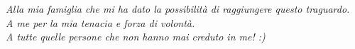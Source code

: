 \null{}
\begin{flushright}
	\textit{Alla mia famiglia che mi ha dato la possibilità di raggiungere questo traguardo.} \\
	\textit{A me per la mia tenacia e forza di volontà.} \\
	\textit{A tutte quelle persone che non hanno mai creduto in me! :)} \\
\end{flushright}
\null